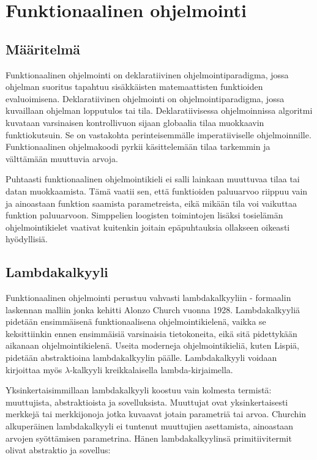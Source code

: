\chapter{Funktionaalinen ohjelmointi} \label{Funktionaalinen ohjelmointi}

\section{Määritelmä}
Funktionaalinen ohjelmointi on deklaratiivinen ohjelmointiparadigma, jossa ohjelman suoritus tapahtuu sisäkkäisten
matemaattisten funktioiden evaluoimisena. Deklaratiivinen ohjelmointi on ohjelmointiparadigma, jossa kuvaillaan ohjelman
lopputulos tai tila. Deklaratiivisessa ohjelmoinnissa algoritmi kuvataan varsinaisen kontrollivuon sijaan globaalia
tilaa muokkaavin funktiokutsuin. Se on vastakohta perinteisemmälle imperatiiviselle ohjelmoinnille. Funktionaalinen
ohjelmakoodi pyrkii käsittelemään tilaa tarkemmin ja välttämään muuttuvia arvoja.\cite{hudak}

Puhtaasti funktionaalinen ohjelmointikieli ei salli lainkaan muuttuvaa tilaa tai datan muokkaamista. Tämä vaatii sen,
että funktioiden paluuarvoo riippuu vain ja ainoastaan funktion saamista parametreista, eikä mikään tila voi vaikuttaa
funktion paluuarvoon. Simppelien loogisten toimintojen lisäksi tosielämän ohjelmointikielet vaativat kuitenkin joitain
epäpuhtauksia ollakseen oikeasti hyödyllisiä.\cite{purelyFunctional}

\section{Lambdakalkyyli}
Funktionaalinen ohjelmointi perustuu vahvasti lambdakalkyyliin - formaalin laskennan malliin jonka kehitti Alonzo Church
vuonna 1928. Lambdakalkyyliä pidetään ensimmäisenä funktionaalisena ohjelmointikielenä, vaikka se keksittiinkin ennen
ensimmäisiä varsinaisia tietokoneita, eikä sitä pidettykään aikanaan ohjelmointikielenä. Useita moderneja
ohjelmointikieliä, kuten Lispiä, pidetään abstraktioina lambdakalkyylin päälle. Lambdakalkyyli voidaan kirjoittaa myös
$ \lambda $-kalkyyli kreikkalaisella lambda-kirjaimella.\cite{hudak}

Yksinkertaisimmillaan lambdakalkyyli koostuu vain kolmesta termistä: muuttujista, abstraktioista ja sovelluksista.
Muuttujat ovat yksinkertaisesti merkkejä tai merkkijonoja jotka kuvaavat jotain parametriä tai arvoa. Churchin
alkuperäinen lambdakalkyyli ei tuntenut muuttujien asettamista, ainoastaan arvojen syöttämisen parametrina. Hänen
lambdakalkyylinsä primitiivitermit olivat abstraktio ja sovellus:

